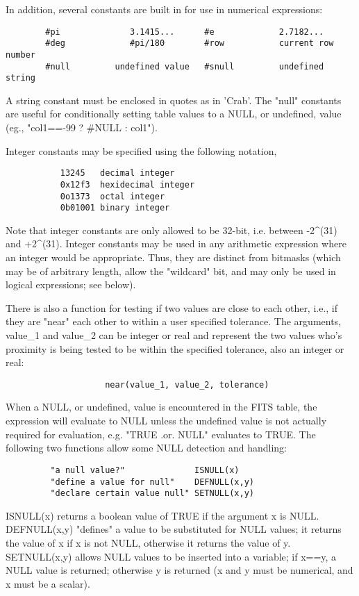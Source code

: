 \documentclass[11pt]{book}
\begin{document}
    In addition, several constants are built in  for  use  in  numerical
    expressions:


\begin{verbatim}
        #pi              3.1415...      #e             2.7182...
        #deg             #pi/180        #row           current row number
        #null         undefined value   #snull         undefined string
\end{verbatim}

    A  string constant must  be enclosed  in quotes  as in  'Crab'.  The
    "null" constants  are useful for conditionally  setting table values
    to a NULL, or undefined, value (eg., "col1==-99 ? \#NULL : col1").

    Integer constants may be specified using the following notation,
\begin{verbatim}
           13245   decimal integer
           0x12f3  hexidecimal integer
           0o1373  octal integer
           0b01001 binary integer
\end{verbatim}
    Note that integer constants are only allowed to be 32-bit, i.e.
    between -2^(31) and +2^(31).  Integer constants may be used in any
    arithmetic expression where an integer would be appropriate.  Thus,
    they are distinct from bitmasks (which may be of arbitrary length,
    allow the "wildcard" bit, and may only be used in logical
    expressions; see below).

    There is also a function for testing if  two  values  are  close  to
    each  other,  i.e.,  if  they are "near" each other to within a user
    specified tolerance. The  arguments,  value\_1  and  value\_2  can  be
    integer  or  real  and  represent  the two values who's proximity is
    being tested to be within the specified tolerance, also  an  integer
    or real:

\begin{verbatim}
                    near(value_1, value_2, tolerance)
\end{verbatim}
    When  a  NULL, or undefined, value is encountered in the FITS table,
    the expression will evaluate to NULL unless the undefined  value  is
    not   actually   required  for  evaluation,  e.g. "TRUE  .or.  NULL"
    evaluates to TRUE. The  following  two  functions  allow  some  NULL
    detection  and  handling:

\begin{verbatim}
         "a null value?"              ISNULL(x)
         "define a value for null"    DEFNULL(x,y)
         "declare certain value null" SETNULL(x,y)
\end{verbatim}
    ISNULL(x)
    returns a boolean value of TRUE if the  argument  x  is  NULL. DEFNULL(x,y)
    "defines"  a  value  to  be  substituted  for NULL values; it
    returns the value of x if x is not NULL, otherwise  it  returns  the
    value of y.  SETNULL(x,y) allows NULL values to be inserted into
    a variable; if x==y, a NULL value is returned; otherwise y is returned
    (x and y must be numerical, and x must be a scalar).
\end{document}
